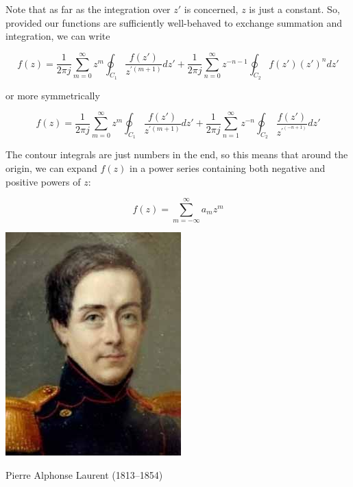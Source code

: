 Note that as far as the integration over $z'$ is concerned, $z$ is just a constant. So, provided our functions are sufficiently well-behaved to exchange summation and integration, we can write

\begin{equation}
f(z)=\frac{1}{2 \pi j } \sum_{m=0}^{\infty} z^m \oint_{{C}_1} \frac{f(z')}{z^{\prime (m+1)}} dz' + \frac{1}{2 \pi j } \sum_{n=0}^{\infty} z ^ {-n-1} \oint_{{C}_2}  {f(z')}  (z')^ n dz'
\end{equation} 

or more symmetrically

\begin{equation}
f(z)=\frac{1}{2 \pi j } \sum_{m=0}^{\infty} z^m \oint_{{C}_1} \frac{f(z')}{z^{\prime (m+1)}} dz' + \frac{1}{2 \pi j } \sum_{n=1}^{\infty} z ^ {-n} \oint_{{C}_2} \frac{f(z')}{z^{\prime^ {(-n+1)}}} dz'
\label{eq-laurent-int}
\end{equation} 

The contour integrals are just numbers in the end, so this means that around the origin, we can expand $f(z)$ in a power series containing both negative and positive powers of $z$:

\begin{equation}
f(z)= \sum_{m=-\infty}^{\infty} a_m z^m
\end{equation} 

\begin{marginfigure}[-5.5cm]
  \includegraphics{complex/figures/pierre_laurent}
  \caption{Pierre Alphonse Laurent (1813–1854)}
\end{marginfigure}

